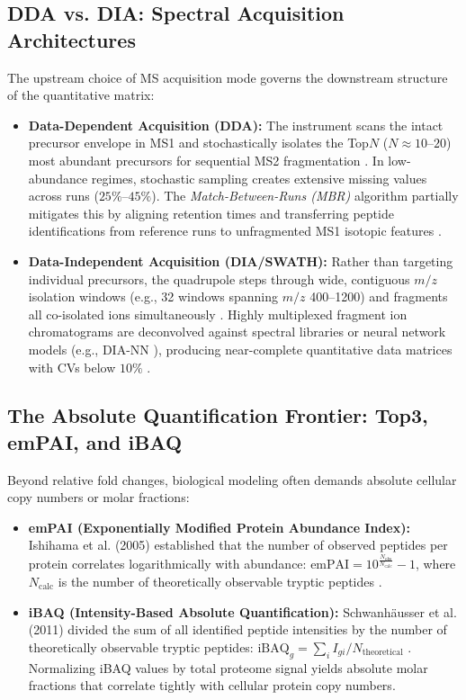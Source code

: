 \documentclass[11pt,oneside]{book}
\begin{document}
\subsection{DDA vs. DIA: Spectral Acquisition Architectures}
The upstream choice of MS acquisition mode governs the downstream structure of the quantitative matrix:
\begin{itemize}
    \item \textbf{Data-Dependent Acquisition (DDA):} The instrument scans the intact precursor envelope in MS1 and stochastically isolates the Top$N$ ($N \approx 10$--$20$) most abundant precursors for sequential MS2 fragmentation \cite{aebersold2016mass}. In low-abundance regimes, stochastic sampling creates extensive missing values across runs ($25\%$--$45\%$). The \textit{Match-Between-Runs (MBR)} algorithm partially mitigates this by aligning retention times and transferring peptide identifications from reference runs to unfragmented MS1 isotopic features \cite{cox2014maxlfq}.
    \item \textbf{Data-Independent Acquisition (DIA/SWATH):} Rather than targeting individual precursors, the quadrupole steps through wide, contiguous $m/z$ isolation windows (e.g., 32 windows spanning $m/z$ 400--1200) and fragments all co-isolated ions simultaneously \cite{gillet2012targeted, rost2014openswath}. Highly multiplexed fragment ion chromatograms are deconvolved against spectral libraries or neural network models (e.g., DIA-NN \cite{demichev2020dia}), producing near-complete quantitative data matrices with CVs below $10\%$ \cite{bruderer2015extending, bruderer2017optimization}.
\end{itemize}

\subsection{The Absolute Quantification Frontier: Top3, emPAI, and iBAQ}
Beyond relative fold changes, biological modeling often demands absolute cellular copy numbers or molar fractions:
\begin{itemize}
    \item \textbf{emPAI (Exponentially Modified Protein Abundance Index):} Ishihama et al. (2005) established that the number of observed peptides per protein correlates logarithmically with abundance: $\text{emPAI} = 10^{\frac{N_{\text{obs}}}{N_{\text{calc}}}} - 1$, where $N_{\text{calc}}$ is the number of theoretically observable tryptic peptides \cite{ishihama2005exponential}.
    \item \textbf{iBAQ (Intensity-Based Absolute Quantification):} Schwanh\"ausser et al. (2011) divided the sum of all identified peptide intensities by the number of theoretically observable tryptic peptides: $\text{iBAQ}_g = \sum_{i} I_{gi} / N_{\text{theoretical}}$ \cite{schwanhausser2011global}. Normalizing iBAQ values by total proteome signal yields absolute molar fractions that correlate tightly with cellular protein copy numbers.
\end{itemize}
\end{document}
